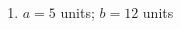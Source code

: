 {\begin{multicols}{3}
\begin{enumerate}[noitemsep, label=\textbf{\arabic*}.]
      \item  $a=5$ units; $b=12$ units%

% 
% 
% 
% 
% 
% 
% 
% 
% 
% 
% 


\end{enumerate}
\end{multicols}}
